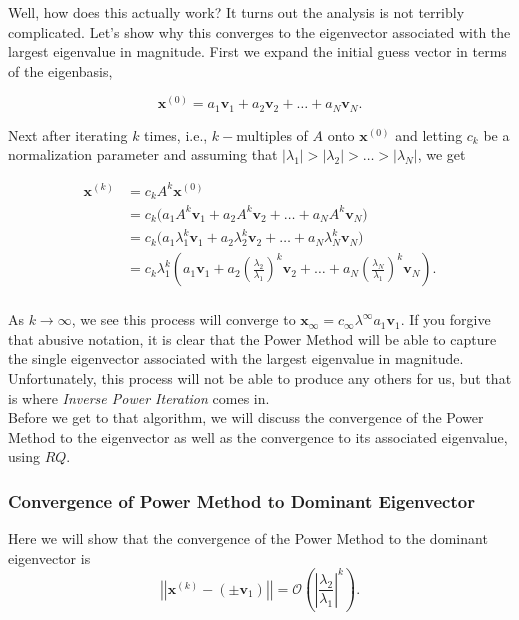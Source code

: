 \documentclass[paper=a4, fontsize=11pt]{scrartcl} %
\numberwithin{equation}{section} %
\numberwithin{figure}{section} %
\numberwithin{table}{section} %
\begin{document}
Well, how does this actually work? It turns out the analysis is not terribly complicated. Let's show why this converges to the eigenvector associated with the largest eigenvalue in magnitude. First we expand the initial guess vector in terms of the eigenbasis,

$$\textbf{x}^{(0)} = a_1 \textbf{v}_1 + a_2 \textbf{v}_2 + \ldots + a_N \textbf{v}_N.$$

Next after iterating $k$ times, i.e., $k-$multiples of $A$ onto $\textbf{x}^{(0)}$ and letting $c_k$ be a normalization parameter and assuming that $\left| \lambda_1 \right| > \left| \lambda_2 \right| >\ldots> \left| \lambda_N \right|$, we get

\begin{align*}
\textbf{x}^{(k)} &= c_k A^k \textbf{x}^{(0)} \\
	&= c_k \Big( a_1 A^k \textbf{v}_1 + a_2 A^k \textbf{v}_2 +\ldots +  a_N A^k \textbf{v}_N  \Big) \\
	&= c_k \Big( a_1 \lambda_1^k \textbf{v}_1 + a_2 \lambda_2^k \textbf{v}_2  +\ldots+ a_N \lambda_N^k \textbf{v}_N   \Big)\\
	&= c_k \lambda_1^k \left(  a_1 \textbf{v}_1 + a_2\left( \frac{\lambda_2}{\lambda_1}  \right)^k \textbf{v}_2 +\ldots+  a_N\left( \frac{\lambda_N}{\lambda_1}  \right)^k \textbf{v}_N    \right). \\
\end{align*}

As $k\rightarrow\infty$, we see this process will converge to $\textbf{x}_{\infty} = c_{\infty} \lambda^{\infty} a_1 \textbf{v}_1$. If you forgive that abusive notation, it is clear that the Power Method will be able to capture the single eigenvector associated with the largest eigenvalue in magnitude. Unfortunately, this process will not be able to produce any others for us, but that is where \emph{Inverse Power Iteration} comes in. \\

Before we get to that algorithm, we will discuss the convergence of the Power Method to the eigenvector as well as the convergence to its associated eigenvalue, using $RQ$.

%
%
\subsubsection{Convergence of Power Method to Dominant Eigenvector}

 Here we will show that the convergence of the Power Method to the dominant eigenvector is $$\left|\left| \textbf{x}^{(k)} - (\pm \textbf{v}_1) \right| \right| = \mathcal{O}\left( \left| \frac{\lambda_2}{\lambda_1}  \right|^k  \right).$$
 
\end{document}
